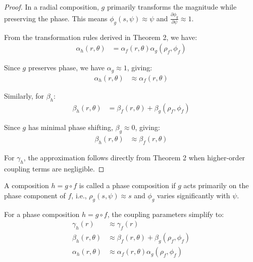 \begin{proof}
In a radial composition, $g$ primarily transforms the magnitude while preserving the phase. This means $\phi_g(s,\psi) \approx \psi$ and $\frac{\partial \phi_g}{\partial \psi} \approx 1$.

From the transformation rules derived in Theorem 2, we have:
\begin{align}
\alpha_h(r,\theta) &= \alpha_f(r,\theta)\alpha_g(\rho_f,\phi_f)
\end{align}

Since $g$ preserves phase, we have $\alpha_g \approx 1$, giving:
\begin{align}
\alpha_h(r,\theta) &\approx \alpha_f(r,\theta)
\end{align}

Similarly, for $\beta_h$:
\begin{align}
\beta_h(r,\theta) &= \beta_f(r,\theta) + \beta_g(\rho_f,\phi_f)
\end{align}

Since $g$ has minimal phase shifting, $\beta_g \approx 0$, giving:
\begin{align}
\beta_h(r,\theta) &\approx \beta_f(r,\theta)
\end{align}

For $\gamma_h$, the approximation follows directly from Theorem 2 when higher-order coupling terms are negligible.
\end{proof}

\begin{definition}
A composition $h = g \circ f$ is called a phase composition if $g$ acts primarily on the phase component of $f$, i.e., $\rho_g(s,\psi) \approx s$ and $\phi_g$ varies significantly with $\psi$.
\end{definition}

\begin{theorem}
For a phase composition $h = g \circ f$, the coupling parameters simplify to:
\begin{align}
\gamma_h(r) &\approx \gamma_f(r)\\
\beta_h(r,\theta) &\approx \beta_f(r,\theta) + \beta_g(\rho_f,\phi_f)\\
\alpha_h(r,\theta) &\approx \alpha_f(r,\theta)\alpha_g(\rho_f,\phi_f)
\end{align}
\end{theorem}

